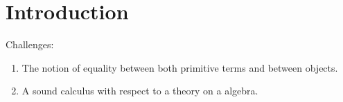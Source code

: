 \section{Introduction}


Challenges:
\begin{enumerate}
  \item The notion of equality between both primitive terms and between objects.
  \item A sound calculus with respect to a theory on a algebra.
\end{enumerate}